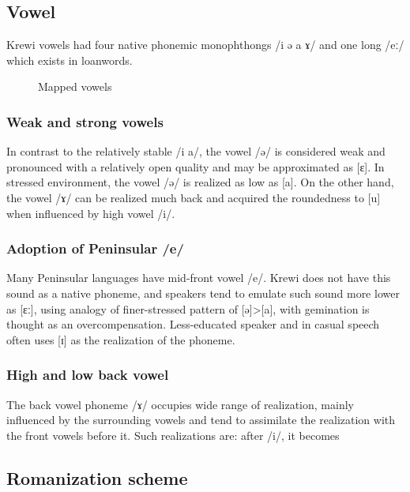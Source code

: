 \subsection{Vowel}
Krewi vowels had four native phonemic monophthongs /i ə a ɤ/ and one long /eː/ which exists in loanwords.

\begin{figure}[h]
	\centering
	\caption{Mapped vowels}
\end{figure}

\subsubsection{Weak and strong vowels}
In contrast to the relatively stable /i a/, the vowel /ə/ is considered weak and pronounced with a relatively open quality and may be approximated as [ɛ]. In stressed environment, the vowel /ə/ is realized as low as [a]. On the other hand, the vowel /ɤ/ can be realized much back and acquired the roundedness to [u] when influenced by high vowel /i/.

\subsubsection{Adoption of Peninsular /e/}
Many Peninsular languages have mid-front vowel /e/. Krewi does not have this sound as a native phoneme, and speakers tend to emulate such sound more lower as [ɛː], using analogy of finer-stressed pattern of [ə]>[a], with gemination is thought as an overcompensation. Less-educated speaker and in casual speech often uses [ɪ] as the realization of the phoneme.

\subsubsection{High and low back vowel}
The back vowel phoneme /ɤ/ occupies wide range of realization, mainly influenced by the surrounding vowels and tend to assimilate the realization with the front vowels before it. Such realizations are: after /i/, it becomes

\subsection{Romanization scheme}%

